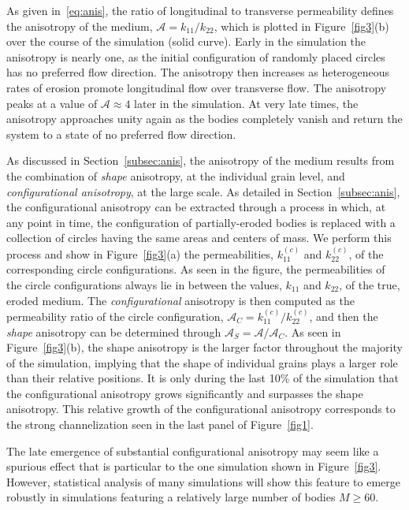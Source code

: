\documentclass[3p]{elsarticle}
\newcommand{\anis}{\mathcal{A}}
\begin{document}
As given in~\eqref{eq:anis}, the ratio of longitudinal to transverse permeability defines the anisotropy of the medium, $\anis = k_{11} / k_{22}$, which is plotted in Figure~\ref{fig3}(b) over the course of the simulation (solid curve). Early in the simulation the anisotropy is nearly one, as the initial configuration of randomly placed circles has no preferred flow direction. The anisotropy then increases as heterogeneous rates of erosion promote longitudinal flow over transverse flow. The anisotropy peaks at a value of $\anis \approx 4$ later in the simulation. At very late times, the anisotropy approaches unity again as the bodies completely vanish and return the system to a state of no preferred flow direction.

As discussed in Section~\ref{subsec:anis}, the anisotropy of the medium results from the combination of {\em shape} anisotropy, at the individual grain level, and {\em configurational anisotropy}, at the large scale. As detailed in Section~\ref{subsec:anis}, the configurational anisotropy can be extracted through a process in which, at any point in time, the configuration of partially-eroded bodies is replaced with a collection of circles having the same areas and centers of mass. We perform this process and show in Figure~\ref{fig3}(a) the permeabilities, $k_{11}^{(c)}$ and $k_{22}^{(c)}$, of the corresponding circle configurations. As seen in the figure, the permeabilities of the circle configurations always lie in between the values, $k_{11}$ and $k_{22}$, of the true, eroded medium. The {\em configurational} anisotropy is then computed as the permeability ratio of the circle configuration, $\anis_C = k_{11}^{(c)} / k_{22}^{(c)}$, and then the {\em shape} anisotropy can be determined through $\anis_S = \anis/\anis_C$. As seen in Figure~\ref{fig3}(b), the shape anisotropy is the larger factor throughout the majority of the simulation, implying that the shape of individual grains plays a larger role than their relative positions. It is only during the last 10\% of the simulation that the configurational anisotropy grows significantly and surpasses the shape anisotropy. This relative growth of the configurational anisotropy corresponds to the strong channelization seen in the last panel of Figure~\ref{fig1}.

The late emergence of substantial configurational anisotropy may seem
like a spurious effect that is particular to the one simulation shown in
Figure~\ref{fig3}. However, statistical analysis of many simulations will show this feature to emerge robustly in simulations featuring a relatively large number of bodies $M \ge 60$.
\end{document}
